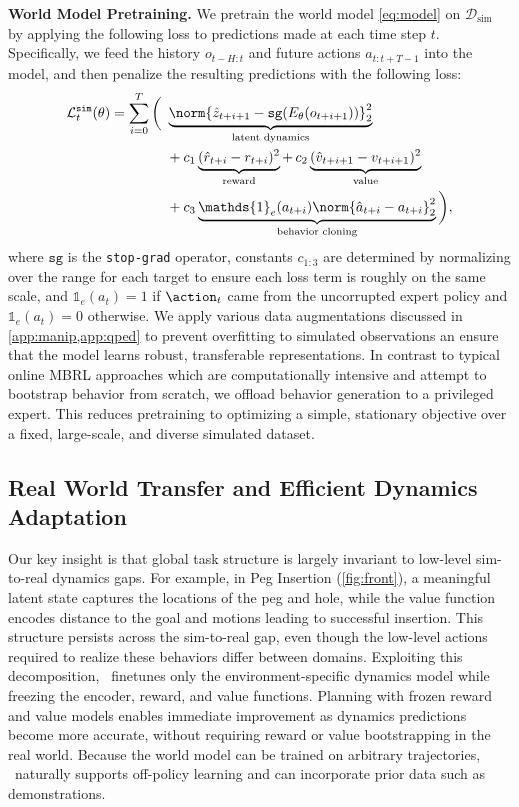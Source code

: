 \textbf{World Model Pretraining.}
We pretrain the world model \cref{eq:model} on $\mathcal{D}_{\text{sim}}$ by applying the following loss to predictions made at each time step $t$. Specifically, we feed the history $o_{t-H:t}$ and future actions $a_{t:t+T-1}$ into the model, and then penalize the resulting predictions with the following loss: 
\begin{equation}
\label{eq:simloss}
\begin{aligned}
\vspace{-.1em}
    \mathcal{L}_t^{\mathtt{sim}}(\theta) = \sum_{i=0}^{T}\bigg(\,\, &\underbrace{\norm{\hat{z}_{t+i+1} - \mathtt{sg}(E_{\theta}(o_{t+i+1}))}^2_2}_{\text{latent dynamics}}\\
    &+ c_1\underbrace{(\hat{r}_{t+i} - r_{t+i})^2}_{\text{reward}} + \, c_2\underbrace{(\hat{v}_{t+i+1} - v_{t+i+1})^2}_{\text{value}}\\
    &+ c_3 \underbrace{\mathds{1}_e(a_{t+i}) \norm{\hat{a}_{t+i} - a_{t+i}}^2_2}_{\text{behavior cloning}}\bigg),
\end{aligned}
\end{equation}
where $\mathtt{sg}$ is the \texttt{stop-grad} operator, constants $c_{1:3}$ are determined by normalizing over the range for each target to ensure each loss term is roughly on the same scale, and $\mathds{1}_e(a_t)=1$ if $\action_t$ came from the uncorrupted expert policy and $\mathds{1}_e(a_t)=0$ otherwise. We apply various data augmentations discussed in \cref{app:manip,app:qped} to prevent overfitting to simulated observations an ensure that the model learns robust, transferable representations. In contrast to typical online MBRL approaches \cite{hansen2022temporal,hafnerdream} which are computationally intensive and attempt to bootstrap behavior from scratch, we offload behavior generation to a privileged expert. This reduces pretraining to optimizing a simple, stationary objective over a fixed, large-scale, and diverse simulated dataset.

\subsection{Real World Transfer and Efficient Dynamics Adaptation}
\label{sec:finetune}
Our key insight is that global task structure is largely invariant to low-level sim-to-real dynamics gaps. For example, in Peg Insertion (\cref{fig:front}), a meaningful latent state captures the locations of the peg and hole, while the value function encodes distance to the goal and motions leading to successful insertion. This structure persists across the sim-to-real gap, even though the low-level actions required to realize these behaviors differ between domains. Exploiting this decomposition, \Method\ finetunes only the environment-specific dynamics model while freezing the encoder, reward, and value functions. Planning with frozen reward and value models enables immediate improvement as dynamics predictions become more accurate, without requiring reward or value bootstrapping in the real world. Because the world model can be trained on arbitrary trajectories, \Method\ naturally supports off-policy learning and can incorporate prior data such as demonstrations.


